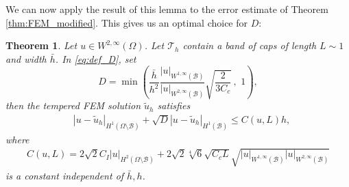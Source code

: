 \documentclass{article}
\newtheorem{theorem}[lemma]{Theorem}
\theoremstyle{remark}
\def \Th {{\mathcal T}_h}
\def\B{\mathcal{B}}
\def\WIi{W^{1,\infty}}
\def\WIIi{W^{2,\infty}}
\def\tu{\tilde{u}}
\def\width{\bar{h}}
\begin{document}
    We can now apply the result of this lemma to the error estimate of Theorem \ref{thm:FEM_modified}. This gives us an optimal choice for $D$: 

    \begin{theorem}
    \label{thm:FEM_modified_band_opt}
    Let $u\in \WIIi(\Omega)$. Let $\Th$ contain a band of caps of length $L\sim 1$ and width $\width$. In \eqref{eq:def_D}, set 
    \begin{equation}
    \label{thm:FEM_modified_band_opt:D}
    D=\min\left(\frac{\width}{h^2}\frac{|u|_{\WIi(\B)}}{|u|_{\WIIi(\B)}}\sqrt{\frac{2}{3C_c}} \, , \, \, 1\right),
    \end{equation}
    then the tempered FEM solution $\tu_h$ satisfies
    \begin{equation}
    \begin{split}
    \label{thm:FEM_modified_band_opt:est}
    &|u-\tu_h|_{H^1(\Omega\setminus\B)} +\sqrt{D}|u-\tu_h|_{H^1(\B)}\leq C(u,L)h,
    \end{split}
    \end{equation}
    where
    \begin{equation}
    \begin{split}
    \label{thm:FEM_modified_band_opt:est2}
    C(u,L)=2\sqrt{2}C_I|u|_{H^2(\Omega\setminus\B)} + 2\sqrt{2}\sqrt[4]{6}\sqrt{C_c L} \sqrt{|u|_{\WIi(\B)}|u|_{\WIIi(\B)}}
    \end{split}
    \end{equation}
    is a constant independent of $\width,h$.
    \end{theorem}
\end{document}
